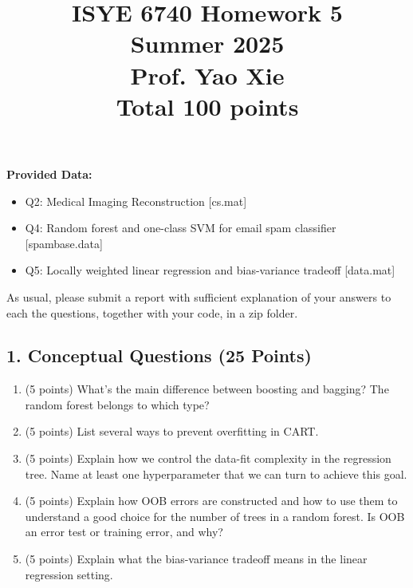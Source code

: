 \documentclass[twoside,10pt]{article}
\begin{document}
\title{ISYE 6740 Homework 5 \\ 
Summer 2025\\ 
Prof. Yao Xie\\
 Total 100 points}
\date{}
\maketitle




\textbf{Provided Data:}
\begin{itemize}
    \item Q2: Medical Imaging Reconstruction [cs.mat]
    \item Q4: Random forest and one-class SVM for email spam classifier [spambase.data]
    \item Q5: Locally weighted linear regression and bias-variance tradeoff [data.mat]
\end{itemize}
As usual, please submit a report with sufficient explanation of your answers to each the questions, together with your code, in a zip folder.



\subsection*{1. Conceptual Questions (25 Points)}

\begin{enumerate}

\item (5 points) What's the main difference between boosting and bagging? The random forest belongs to which type?

\item (5 points) List several ways to prevent overfitting in CART.

\item (5 points) Explain how we control the data-fit complexity in the regression tree. Name at least one hyperparameter that we can turn to achieve this goal.

\item (5 points) Explain how OOB errors are constructed and how to use them to understand a good choice for the number of trees in a random forest. Is OOB an error test or training error, and why?

\item (5 points) Explain what the bias-variance tradeoff means in the linear regression setting. 

\end{enumerate}
\end{document}
